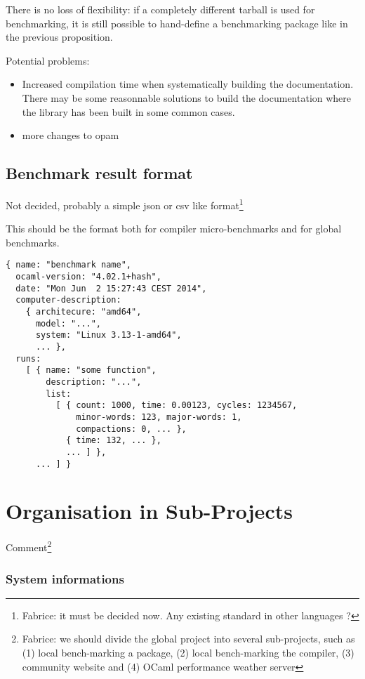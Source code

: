 \documentclass[11pt,a4paper]{article}
\begin{document}
There is no loss of flexibility: if a completely different tarball is
used for benchmarking, it is still possible to hand-define a
benchmarking package like in the previous proposition.

Potential problems:
\begin{itemize}
\item Increased compilation time when systematically building the
  documentation. There may be some reasonnable solutions to build the
  documentation where the library has been built in some common cases.
\item more changes to opam
\end{itemize}

\subsection{Benchmark result format}

Not decided, probably a simple json or csv like
format\footnote{Fabrice: it must be decided now. Any existing standard
  in other languages ?}

This should be the format both for compiler micro-benchmarks and for
global benchmarks.

\begin{verbatim}
{ name: "benchmark name",
  ocaml-version: "4.02.1+hash",
  date: "Mon Jun  2 15:27:43 CEST 2014",
  computer-description:
    { architecure: "amd64",
      model: "...",
      system: "Linux 3.13-1-amd64",
      ... },
  runs:
    [ { name: "some function",
        description: "...",
        list:
          [ { count: 1000, time: 0.00123, cycles: 1234567,
              minor-words: 123, major-words: 1,
              compactions: 0, ... },
            { time: 132, ... },
            ... ] },
      ... ] }
\end{verbatim}

\section{Organisation in Sub-Projects}

Comment\footnote{Fabrice: we should divide the global project into
  several sub-projects, such as (1) local bench-marking a package, (2)
  local bench-marking the compiler, (3) community website and (4)
  OCaml performance weather server}

\subsubsection{System informations}
\end{document}

